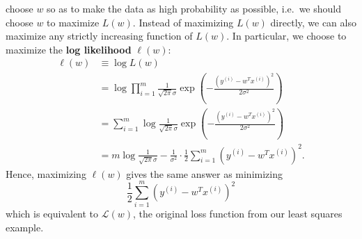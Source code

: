 \documentclass[../main.tex]{subfiles}
\begin{document}
choose $w$ so as to make the data as high probability as possible, i.e.\ we
should choose $w$ to maximize $L(w)$.
%
Instead of maximizing $L(w)$ directly, we can also maximize any strictly
increasing function of $L(w)$.
%
In particular, we choose to maximize the \textbf{log likelihood} $\ell(w)$:
%
\begin{align}
  \ell(w) &\equiv \log{L(w)}\\
          &= \log\prod_{i=1}^{m} \frac{1}{\sqrt{2\pi}\sigma}\exp{\left(-
            \frac{{(y^{(i)} - w^{T}x^{(i)})}^{2}}{2\sigma^{2}}\right)}\\
          &= \sum_{i=1}^{m} \log\frac{1}{\sqrt{2\pi}\sigma}\exp{\left(-
            \frac{{(y^{(i)} - w^{T}x^{(i)})}^{2}}{2\sigma^{2}}\right)}\\
          &= m \log \frac{1}{\sqrt{2\pi}\sigma} - \frac{1}{\sigma^{2}} \cdot
            \frac{1}{2} \sum_{i=1}^{m}{\left(y^{(i)} - w^{T}
            x^{(i)}\right)}^{2}.  
\end{align}
%
Hence, maximizing $\ell(w)$ gives the same answer as minimizing
%
\begin{equation}
  \frac{1}{2}\sum_{i=1}^{m}{\left(y^{(i)} - w^{T} x^{(i)}\right)}^{2}
\end{equation}
%
which is equivalent to $\mathcal{L}(w)$, the original loss function from our
least squares example.
\end{document}
